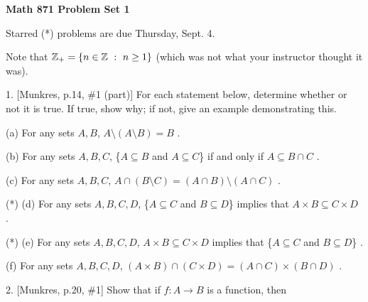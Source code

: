 


\def\ctln{\centerline}
\def\msk{\medskip}
\def\bsk{\bigskip}
\def\ssk{\smallskip}
\def\ra{\rightarrow}

\UseAMSsymbols

\ctln{\bf Math 871 Problem Set 1}

\msk

Starred (*) problems are due Thursday, Sept. 4.

\ssk

Note that ${\Bbb Z}_+ = \{n\in{\Bbb Z}\ :\ n\geq 1\}$ (which was not what your
instructor thought it was).

\msk

\item{1.} [Munkres, p.14, \#1 (part)] For each statement below,
determine whether or not it is true. If true, show why; if 
not, give an example demonstrating this.

\ssk

\item{} (a) For any sets $A,B$, $A \setminus (A\setminus B) = B$ .

\ssk

\item{} (b) For any sets $A,B,C$, \{$A\subseteq B$ and $A\subseteq C$\} 
if and only if $A\subseteq B\cap C$ .

\ssk

\item{} (c) For any sets $A,B,C$, $A\cap(B\setminus C) = (A\cap B)\setminus(A\cap C)$ .

\ssk

\item{(*)} (d) For any sets $A,B,C,D$, \{$A\subseteq C$ and $B\subseteq D$\} implies that 
$A\times B \subseteq C\times D$ .

\ssk

\item{(*)} (e) For any sets $A,B,C,D$, $A\times B \subseteq C\times D$ implies that 
\{$A\subseteq C$ and $B\subseteq D$\} .

\ssk

\item{} (f) For any sets $A,B,C,D$, $(A\times B)\cap(C\times D) = (A\cap C)\times (B\cap D)$ .

\msk

\item{2.} [Munkres, p.20, \#1] Show that if $f:A\ra B$ is a function, then

\ssk

